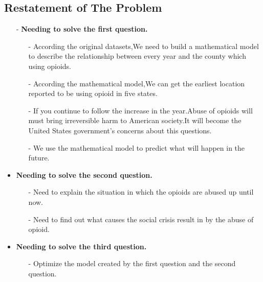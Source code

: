 \documentclass{mcmthesis}
\begin{document}
\subsection{Restatement of The Problem}
\begin{itemize}
	\item[-] \textbf{Needing to solve the first question.} \\ %
	\begin{itemize} %
	\item[-] According the original datasets,We need to build a mathematical model to describe the relationship between every year and the county which using opioids.\\
	\item[-]  According the  mathematical model,We can get the earliest location reported to be using opioid in five states.  \\
	\item[-]  	If you continue to follow the increase in the year.Abuse of opioids will must bring irreversible harm to American society.It will become the United States government’s concerns about this questions. \\
	\item[-] We use the mathematical model to predict what will happen in the future.
	\end{itemize}
\newpage

	\item \textbf{Needing to solve the second question.} \\ %
	\begin{itemize} %
      \item[-] Need to explain the situation in which the opioids are abused up until now.\\  %
      \item [-] Need to find out what causes the social crisis result in by the abuse of opioid.\\%
    \end{itemize}
		
	\item \textbf{Needing to solve the third question.} \\ %
	   \begin{itemize}
	   	\item[-] Optimize the model created by the first question and the second question.%
	   \end{itemize}
\end{itemize}
\end{document}
